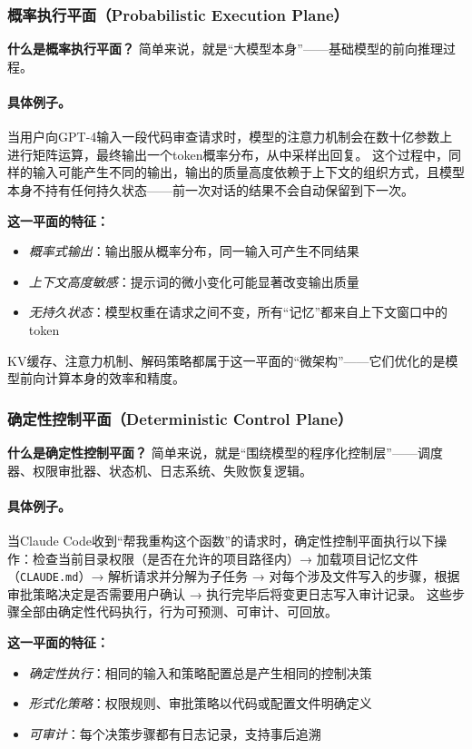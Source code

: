 \subsubsection{概率执行平面（Probabilistic Execution Plane）}

\textbf{什么是概率执行平面？}
简单来说，就是``大模型本身''——基础模型的前向推理过程。

\paragraph{具体例子。}当用户向GPT-4输入一段代码审查请求时，模型的注意力机制会在数十亿参数上进行矩阵运算，最终输出一个token概率分布，从中采样出回复。
这个过程中，同样的输入可能产生不同的输出，输出的质量高度依赖于上下文的组织方式，且模型本身不持有任何持久状态——前一次对话的结果不会自动保留到下一次。

\textbf{这一平面的特征：}
\begin{itemize}[nosep]
\item \textit{概率式输出}：输出服从概率分布，同一输入可产生不同结果
\item \textit{上下文高度敏感}：提示词的微小变化可能显著改变输出质量
\item \textit{无持久状态}：模型权重在请求之间不变，所有``记忆''都来自上下文窗口中的token
\end{itemize}

KV缓存、注意力机制、解码策略都属于这一平面的``微架构''——它们优化的是模型前向计算本身的效率和精度。

\subsubsection{确定性控制平面（Deterministic Control Plane）}

\textbf{什么是确定性控制平面？}
简单来说，就是``围绕模型的程序化控制层''——调度器、权限审批器、状态机、日志系统、失败恢复逻辑。

\paragraph{具体例子。}当Claude Code收到``帮我重构这个函数''的请求时，确定性控制平面执行以下操作：检查当前目录权限（是否在允许的项目路径内）→ 加载项目记忆文件（\texttt{CLAUDE.md}）→ 解析请求并分解为子任务 → 对每个涉及文件写入的步骤，根据审批策略决定是否需要用户确认 → 执行完毕后将变更日志写入审计记录\cite{anthropic_claudecode_security_2026}。
这些步骤全部由确定性代码执行，行为可预测、可审计、可回放。

\textbf{这一平面的特征：}
\begin{itemize}[nosep]
\item \textit{确定性执行}：相同的输入和策略配置总是产生相同的控制决策
\item \textit{形式化策略}：权限规则、审批策略以代码或配置文件明确定义
\item \textit{可审计}：每个决策步骤都有日志记录，支持事后追溯
\end{itemize}


